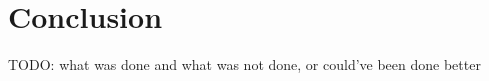 \chapter{Conclusion}\label{ch:conclusion}

TODO: what was done and what was not done, or could've been done better
